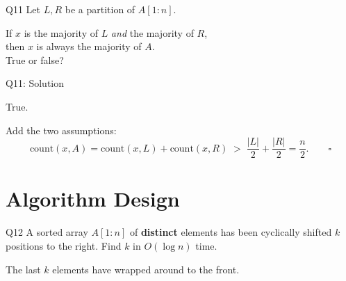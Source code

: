 \documentclass[10pt,aspectratio=169]{beamer}
\begin{document}
\begin{frame}{Q11}
  Let $L, R$ be a partition of $A[1:n]$.

  \bigskip
  \begin{center}
    \Large
    If $x$ is the majority of $L$ \emph{and} the majority of $R$,\\
    then $x$ is always the majority of $A$.\\[0.6em]
    True or false?
  \end{center}
\end{frame}

\begin{frame}{Q11: Solution}
  \begin{center}
    \alert{\Large True.}
  \end{center}

  \bigskip
  Add the two assumptions:
  \[
    \text{count}(x, A) = \text{count}(x,L) + \text{count}(x,R)
    \;>\; \frac{|L|}{2} + \frac{|R|}{2} = \frac{n}{2}. \qquad \square
  \]
\end{frame}

\section{Algorithm Design}

\begin{frame}{Q12}
  A sorted array $A[1:n]$ of \textbf{distinct} elements has been cyclically
  shifted $k$ positions to the right. Find $k$ in $O(\log n)$ time.

  \bigskip
  \begin{center}
  \end{center}

  \bigskip
  \begin{center}
    \small The last $k$ elements have wrapped around to the front.
  \end{center}
\end{frame}
\end{document}
